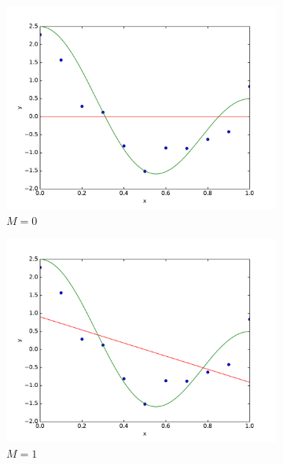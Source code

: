 \documentclass[10pt,psamsfonts]{amsart}
\theoremstyle{definition}
\theoremstyle{remark}
\numberwithin{equation}{section}
\begin{document}
\begin{figure}
	\centering
	\begin{subfigure}[b]{0.24\textwidth}
		\includegraphics[width=\textwidth]{hw1_2-1_0.pdf}
		\caption{$M=0$}
	\end{subfigure}
	\begin{subfigure}[b]{0.24\textwidth}
		\includegraphics[width=\textwidth]{hw1_2-1_1.pdf}
		\caption{$M=1$}
	\end{subfigure}
	\begin{subfigure}[b]{0.24\textwidth}

\end{subfigure}
\end{figure}
\end{document}
